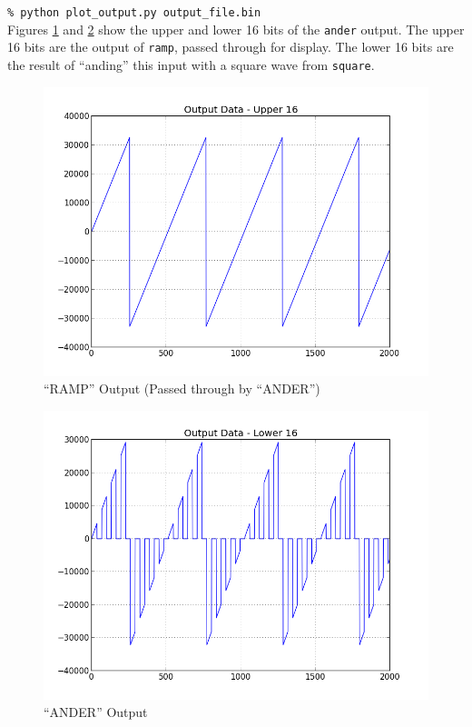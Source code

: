 \forceindent\verb+% python plot_output.py output_file.bin+\\
\bend
Figures \ref{fig:upper16} and \ref{fig:lower16} show the upper and lower 16 bits of the \verb+ander+ output. The upper 16 bits are the output of \verb+ramp+, passed through for display. The lower 16 bits are the result of ``anding'' this input with a square wave from \verb+square+.\\

        \begin{figure}[h]
                \centering
                \includegraphics[scale=0.5]{./figures/upper16.jpg}
                \caption{``RAMP'' Output (Passed through by ``ANDER'')}
                \label{fig:upper16}
        \end{figure}

        \begin{figure}[h]
                \centering
                \includegraphics[scale=0.5]{./figures/lower16.jpg}
                \caption{``ANDER'' Output}
                \label{fig:lower16}
        \end{figure}

